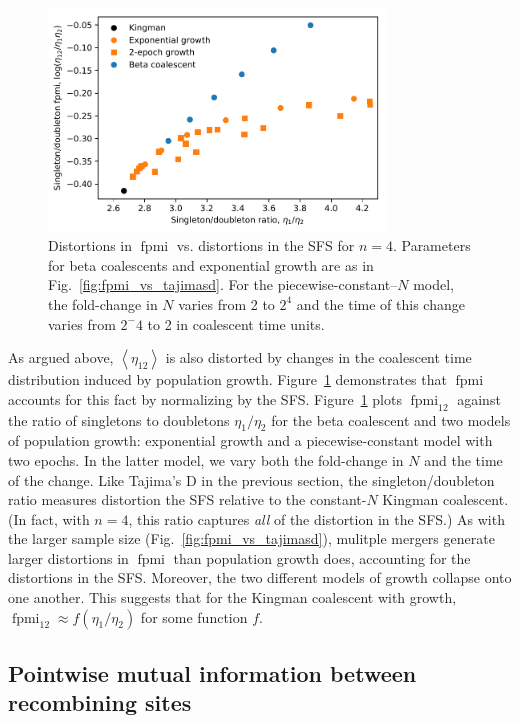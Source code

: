 \documentclass[11pt, letterpaper]{article}   	%
\newcommand{\fig}[1]{Fig.~\ref{#1}}
\newcommand{\Fig}[1]{Figure~\ref{#1}}
\newcommand{\E}[1]{\left< #1 \right>}
\DeclareMathOperator{\fpmi}{fpmi}
\begin{document}
\begin{figure}
\centering
\includegraphics[width=0.8\textwidth]{figures/figure3.pdf}
\caption{Distortions in $\fpmi$ vs. distortions in the SFS for $n=4$. Parameters for beta coalescents and exponential growth are as in \fig{fig:fpmi_vs_tajimasd}. For the piecewise-constant--$N$ model, the fold-change in $N$ varies from 2 to $2^4$ and the time of this change varies from $2^-4$ to 2 in coalescent time units. \label{fig:sdpmi_vs_sdratio}}
\end{figure}

As argued above, $\E{\eta_{12}}$ is also distorted by changes in the coalescent time distribution induced by population growth.
\Fig{fig:sdpmi_vs_sdratio} demonstrates that $\fpmi$ accounts for this fact by normalizing by the SFS.
\Fig{fig:sdpmi_vs_sdratio} plots $\fpmi_{12}$ against the ratio of singletons to doubletons $\eta_1 / \eta_2$ for the beta coalescent and two models of population growth: exponential growth and a piecewise-constant model with two epochs.
In the latter model, we vary both the fold-change in $N$ and the time of the change.
Like Tajima's D in the previous section, the singleton/doubleton ratio measures distortion the SFS relative to the constant-$N$ Kingman coalescent.
(In fact, with $n=4$, this ratio captures \emph{all} of the distortion in the SFS.)
As with the larger sample size (\fig{fig:fpmi_vs_tajimasd}), mulitple mergers generate larger distortions in $\fpmi$ than population growth does, accounting for the distortions in the SFS.
Moreover, the two different models of growth collapse onto one another.
This suggests that for the Kingman coalescent with growth, $\fpmi_{12} \approx f(\eta_1/\eta_2)$ for some function $f$.

\subsection*{Pointwise mutual information between recombining sites}
\end{document}
